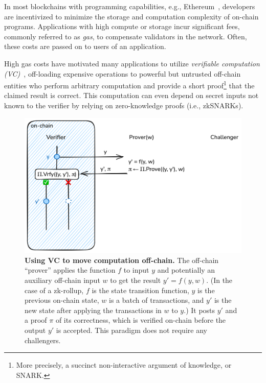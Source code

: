 In most blockchains with programming capabilities, e.g., Ethereum~\cite{ethereum_yellowpaper}, developers are incentivized to minimize the storage and computation complexity of on-chain programs. Applications with high compute or storage incur significant fees, commonly referred to as \emph{gas}, to compensate validators in the network. Often, these costs are passed on to users of an application. 

High gas costs have motivated many applications to utilize \emph{verifiable computation (VC)}~\cite{C:GenGenPar10}, off-loading expensive operations to powerful but untrusted off-chain entities who perform arbitrary computation and provide a short proof\footnote{More precisely, a succinct non-interactive argument of knowledge, or SNARK.} that the claimed result is correct.
This computation can even depend on secret inputs not known to the verifier by relying on zero-knowledge proofs (i.e., zkSNARKs).

 \begin{figure}[tbh]
    \includegraphics[width=\textwidth]{naysayer/figs/vc.png}
    \caption{\textbf{Using VC to move computation off-chain.} The off-chain ``prover'' applies the function $f$ to input $y$ and potentially an auxiliary off-chain input $w$ to get the result $y' = f(y, w)$. (In the case of a zk-rollup, $f$ is the state transition function, $y$ is the previous on-chain state, $w$ is a batch of transactions, and $y'$ is the new state after applying the transactions in $w$ to $y$.) It posts $y'$ and a proof $\pi$ of its correctness, which is verified on-chain before the output $y'$ is accepted. This paradigm does not require any challengers.}
    \label{fig:vc}
 \end{figure}

